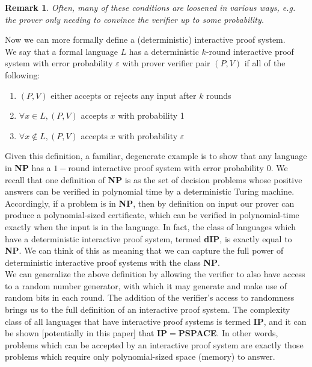 \documentclass[12pt]{article}
\newtheorem*{rmk}{Remark}
\begin{document}
	\begin{rmk} Often, many of these conditions are loosened in various ways, e.g. the prover only needing to convince the verifier up to some probability.\end{rmk}
	
	Now we can more formally define a (deterministic) interactive proof system.\\
	
	We say that a formal language $L$ has a  deterministic $k$-round interactive proof system with error probability $\varepsilon$ with prover verifier pair $(P,V)$ if all of the following:
	\begin{enumerate}
		\item $(P,V)$ either accepts or rejects any input after $k$ rounds
		\item $\forall x\in L, (P,V)$ accepts $x$ with probability 1
		\item $\forall x\notin L, (P,V)$ accepts $x$ with probability $\varepsilon$ 
	\end{enumerate}
	
	Given this definition, a familiar, degenerate example is to show that any language in \textbf{NP} has a $1-$round interactive proof system with error probability $0$. We recall that one definition of \textbf{NP} is as the set of decision problems whose positive answers can be verified in polynomial time by a deterministic Turing machine. Accordingly, if a problem is in \textbf{NP}, then by definition on input our prover can produce a polynomial-sized certificate, which can be verified in polynomial-time exactly when the input is in the language. In fact, the class of languages which have a deterministic interactive proof system, termed \textbf{dIP}, is exactly equal to \textbf{NP}. We can think of this as meaning that we can capture the full power of deterministic interactive proof systems with the class \textbf{NP}.\\
	
	We can generalize the above definition by allowing the verifier to also have access to a random number generator, with which it may generate and make use of random bits in each round. The addition of the verifier's access to randomness brings us to the full definition of an interactive proof system. The complexity class of all languages that have interactive proof systems is termed \textbf{IP}, and it can be shown [potentially in this paper] that \textbf{IP}$=$\textbf{PSPACE}. In other words, problems which can be accepted by an interactive proof system are exactly those problems which require only polynomial-sized space (memory) to answer. 
\end{document}
